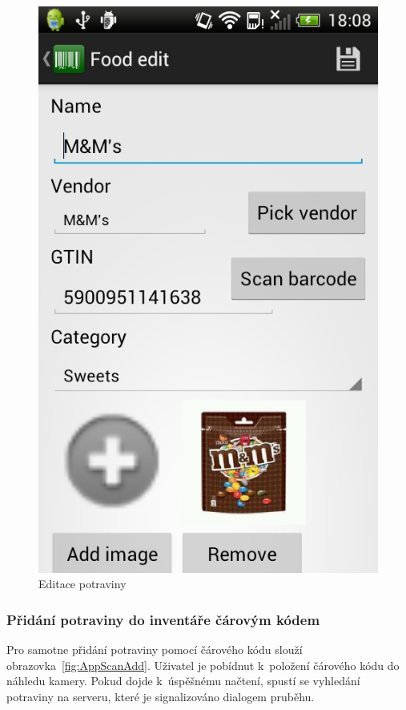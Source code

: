 \documentclass[thesis=B,czech]{FITthesis}[2013/10/20]
\begin{document}
\begin{figure}[H]
  \centering
  \includegraphics[scale=0.35]{screenshots/app_food_edit.png}
  \caption{Editace potraviny}
  \label{fig:AppFoodEdit}
\end{figure}

\clearpage

\subsubsection{Přidání potraviny do inventáře čárovým kódem}

Pro samotne přidání potraviny pomocí čárového kódu slouží obrazovka~\ref{fig:AppScanAdd}. Uživatel je pobídnut k~položení čárového kódu do náhledu kamery. Pokud dojde k~úspěšnému načtení, spustí se vyhledání potraviny na serveru, které je signalizováno dialogem pruběhu.
\end{document}
